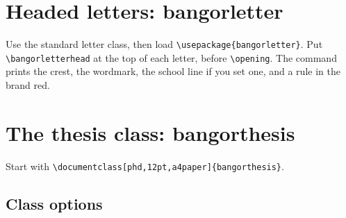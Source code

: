 \documentclass[a4paper,12pt]{article}
\begin{document}
\section{Headed letters: bangorletter}
Use the standard \textsf{letter} class, then load
\verb|\usepackage{bangorletter}|. Put \verb|\bangorletterhead| at the
top of each letter, before \verb|\opening|. The command prints the
crest, the wordmark, the school line if you set one, and a rule in the
brand red.

\section{The thesis class: bangorthesis}
Start with \verb|\documentclass[phd,12pt,a4paper]{bangorthesis}|.

\subsection{Class options}
\end{document}
